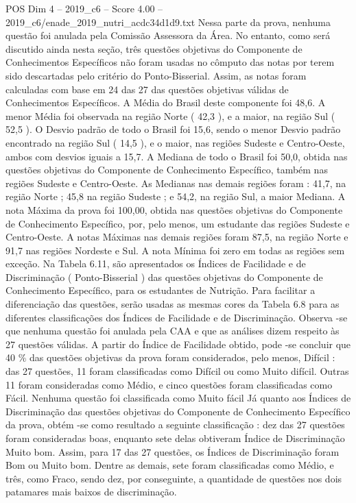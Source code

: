 \begin{textsample}{POS Dim 4 – 2019\_c6 – Score 4.00 – 2019\_c6/enade\_2019\_nutri\_acdc34d1d9.txt}
Nessa parte da prova, nenhuma questão foi anulada pela Comissão Assessora da Área.
No entanto, como será discutido ainda nesta seção, três questões objetivas do Componente de Conhecimentos Específicos não foram usadas no cômputo das notas por terem sido descartadas pelo critério do Ponto-Bisserial.
Assim, as notas foram calculadas com base em 24 das 27 das questões objetivas válidas de Conhecimentos Específicos.
A Média do Brasil deste componente foi 48,6.
A menor Média foi observada na região Norte ( 42,3 ), e a maior, na região Sul ( 52,5 ).
O Desvio padrão de todo o Brasil foi 15,6, sendo o menor Desvio padrão encontrado na região Sul ( 14,5 ), e o maior, nas regiões Sudeste e Centro-Oeste, ambos com desvios iguais a 15,7.
A Mediana de todo o Brasil foi 50,0, obtida nas questões objetivas do Componente de Conhecimento Específico, também nas regiões Sudeste e Centro-Oeste.
As Medianas nas demais regiões foram : 41,7, na região Norte ; 45,8 na região Sudeste ; e 54,2, na região Sul, a maior Mediana.
A nota Máxima da prova foi 100,00, obtida nas questões objetivas do Componente de Conhecimento Específico, por, pelo menos, um estudante das regiões Sudeste e Centro-Oeste.
A notas Máximas nas demais regiões foram 87,5, na região Norte e 91,7 nas regiões Nordeste e Sul.
A nota Mínima foi zero em todas as regiões sem exceção.
Na Tabela 6.11, são apresentados os Índices de Facilidade e de Discriminação ( Ponto-Bisserial ) das questões objetivas do Componente de Conhecimento Específico, para os estudantes de Nutrição.
Para facilitar a diferenciação das questões, serão usadas as mesmas cores da Tabela 6.8 para as diferentes classificações dos Índices de Facilidade e de Discriminação.
Observa -se que nenhuma questão foi anulada pela CAA e que as análises dizem respeito às 27 questões válidas.
A partir do Índice de Facilidade obtido, pode -se concluir que 40 \% das questões objetivas da prova foram considerados, pelo menos, Difícil : das 27 questões, 11 foram classificadas como Difícil ou como Muito difícil.
Outras 11 foram consideradas como Médio, e cinco questões foram classificadas como Fácil.
Nenhuma questão foi classificada como Muito fácil Já quanto aos Índices de Discriminação das questões objetivas do Componente de Conhecimento Específico da prova, obtém -se como resultado a seguinte classificação : dez das 27 questões foram consideradas boas, enquanto sete delas obtiveram Índice de Discriminação Muito bom.
Assim, para 17 das 27 questões, os Índices de Discriminação foram Bom ou Muito bom.
Dentre as demais, sete foram classificadas como Médio, e três, como Fraco, sendo dez, por conseguinte, a quantidade de questões nos dois patamares mais baixos de discriminação.

\end{textsample}
